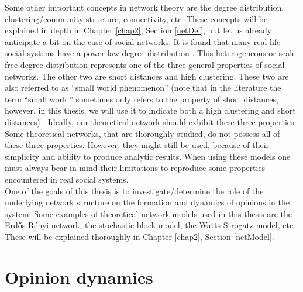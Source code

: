 \documentclass[11 pt , letterpaper , twoside , openright]{book}
\begin{document}
Some other important concepts in network theory are the degree distribution, clustering/community structure, connectivity, etc. These concepts will be explained in depth in Chapter \ref{chap2}, Section \ref{netDef}, but let us already anticipate a bit on the case of social networks. It is found that many real-life social systems have a power-law degree distribution \cite{Muchnik2013}. This heterogeneous or scale-free degree distribution represents one of the three general properties of social networks. The other two are short distances and high clustering. These two are also referred to as ``small world phenomenon'' (note that in the literature the term ``small world'' sometimes only refers to the property of short distances, however, in this thesis, we will use it to indicate both a high clustering and short distances) \cite{Muchnik2013}. Ideally, our theoretical network should exhibit these three properties. Some theoretical networks, that are thoroughly studied, do not possess all of these three properties. However, they might still be used, because of their simplicity and ability to produce analytic results. When using these models one must always bear in mind their limitations to reproduce some properties encountered in real social systems. \\
\newline
One of the goals of this thesis is to investigate/determine the role of the underlying network structure on the formation and dynamics of opinions in the system. Some examples of theoretical network models used in this thesis are the Erd\H{o}s-R\'{e}nyi network, the stochastic block model, the Watts-Strogatz model, etc. These will be explained thoroughly in Chapter \ref{chap2}, Section \ref{netModel}. 



\section{Opinion dynamics}\label{Opinion}
\end{document}
